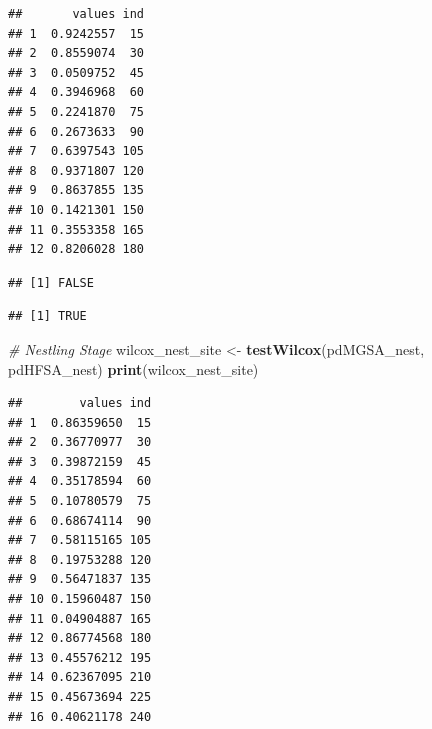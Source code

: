 \documentclass[]{article}
\newenvironment{Shaded}{\begin{snugshade}}{\end{snugshade}}
\newcommand{\CommentTok}[1]{\textcolor[rgb]{0.56,0.35,0.01}{\textit{#1}}}
\newcommand{\FloatTok}[1]{\textcolor[rgb]{0.00,0.00,0.81}{#1}}
\newcommand{\KeywordTok}[1]{\textcolor[rgb]{0.13,0.29,0.53}{\textbf{#1}}}
\newcommand{\NormalTok}[1]{#1}
\newcommand{\OperatorTok}[1]{\textcolor[rgb]{0.81,0.36,0.00}{\textbf{#1}}}
\newcommand{\StringTok}[1]{\textcolor[rgb]{0.31,0.60,0.02}{#1}}
\begin{document}
\begin{verbatim}
##       values ind
## 1  0.9242557  15
## 2  0.8559074  30
## 3  0.0509752  45
## 4  0.3946968  60
## 5  0.2241870  75
## 6  0.2673633  90
## 7  0.6397543 105
## 8  0.9371807 120
## 9  0.8637855 135
## 10 0.1421301 150
## 11 0.3553358 165
## 12 0.8206028 180
\end{verbatim}

\begin{Shaded}
\end{Shaded}

\begin{verbatim}
## [1] FALSE
\end{verbatim}

\begin{Shaded}
\end{Shaded}

\begin{verbatim}
## [1] TRUE
\end{verbatim}

\begin{Shaded}
\begin{Highlighting}[]
\CommentTok{# Nestling Stage}
\NormalTok{wilcox_nest_site <-}\StringTok{ }\KeywordTok{testWilcox}\NormalTok{(pdMGSA_nest, pdHFSA_nest)}
\KeywordTok{print}\NormalTok{(wilcox_nest_site)}
\end{Highlighting}
\end{Shaded}

\begin{verbatim}
##        values ind
## 1  0.86359650  15
## 2  0.36770977  30
## 3  0.39872159  45
## 4  0.35178594  60
## 5  0.10780579  75
## 6  0.68674114  90
## 7  0.58115165 105
## 8  0.19753288 120
## 9  0.56471837 135
## 10 0.15960487 150
## 11 0.04904887 165
## 12 0.86774568 180
## 13 0.45576212 195
## 14 0.62367095 210
## 15 0.45673694 225
## 16 0.40621178 240
\end{verbatim}
\end{document}
